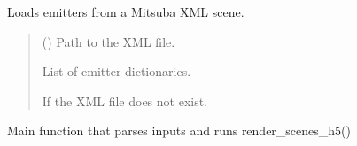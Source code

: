 \documentclass[letterpaper,10pt,english]{sphinxmanual}
\begin{document}
\begin{fulllineitems}
\label{\detokenize{mitsuba_render_h5:mitsuba_render_h5.load_emitters}}
\pysigstartsignatures
\pysiglinewithargsret
{}
{}
{}
\pysigstopsignatures
\sphinxAtStartPar
Loads emitters from a Mitsuba XML scene.
\begin{quote}\begin{description}
\sphinxAtStartPar
{} () \textendash{} Path to the XML file.

\sphinxAtStartPar
List of emitter dictionaries.

\sphinxAtStartPar
{} \textendash{} If the XML file does not exist.

\end{description}\end{quote}

\end{fulllineitems}


\begin{fulllineitems}
\label{\detokenize{mitsuba_render_h5:mitsuba_render_h5.main}}
\pysigstartsignatures
\pysiglinewithargsret
{}
{}
{}
\pysigstopsignatures
\sphinxAtStartPar
Main function that parses inputs and runs render\_scenes\_h5()

\end{fulllineitems}

\end{document}
